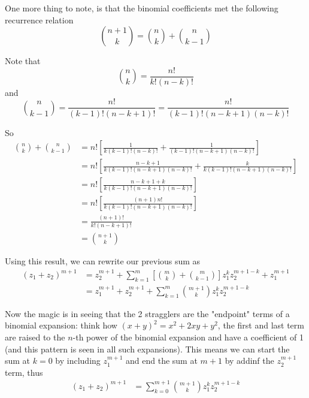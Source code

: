 One more thing to note, is that the binomial coefficients met the following recurrence relation
$$
\binom{n+1}{k} = \binom{n}{k} + \binom{n}{k-1}
$$

Note that
$$
\binom{n}{k} = \frac{n!}{k! (n-k)!}
$$
and
$$
\binom{n}{k-1} = \frac{n!}{(k-1)! (n - k + 1)!} = \frac{n!}{(k-1)! (n - k + 1) (n-k)!}
$$

So
\begin{align*}
\binom{n}{k} + \binom{n}{k-1} &=
    n! \left[ \frac{1}{k (k-1)! (n-k)!} + \frac{1}{(k-1)! (n - k + 1) (n-k)!} \right] \\
&= n! \left[ \frac{n - k + 1}{k (k-1)! (n - k + 1) (n-k)!} + \frac{k}{k (k-1)! (n - k + 1) (n-k)!} \right] \\
&= n! \left[ \frac{n - k + 1 + k}{k (k-1)! (n - k + 1) (n-k)!} \right] \\
&= n! \left[ \frac{(n + 1) n!}{k (k-1)! (n - k + 1) (n-k)!} \right] \\
&= \frac{(n + 1)!}{k! (n - k + 1)!} \\
&= \binom{n+1}{k}
\end{align*}

Using this result, we can rewrite our previous sum as
\begin{align*}
(z_1 + z_2)^{m+1} &= 
z_{2}^{m+1} + 
\sum^{m}_{k=1} \left[ \binom{m}{k} + \binom{m}{k-1} \right] z_{1}^{k} z_{2}^{m+1-k} + z_{1}^{m+1} \\
&= z_{1}^{m+1} + z_{2}^{m+1} + \sum^{m}_{k=1} \binom{m+1}{k} z_{1}^{k} z_{2}^{m+1-k}
\end{align*}

Now the magic is in seeing that the 2 stragglers are the "endpoint" terms of a binomial expansion:
think how $(x+y)^2 = x^2 + 2xy + y^2$, the first and last term are raised to the $n$-th power
of the binomial expansion and have a coefficient of 1 (and this pattern is seen in all such expansions).
This means we can start the sum at $k=0$ by including $z_{1}^{m+1}$ and end the sum at $m+1$
by addinf the $z_{2}^{m+1}$ term, thus
\begin{align*}
(z_1 + z_2)^{m+1} &=
\sum^{m+1}_{k=0} \binom{m+1}{k} z_{1}^{k} z_{2}^{m+1-k}
\end{align*}